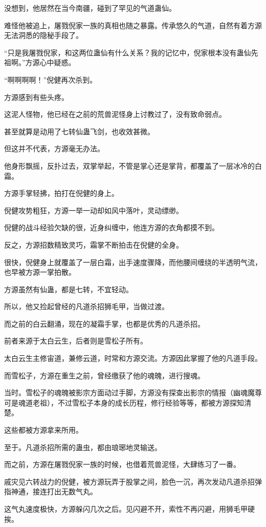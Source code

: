 \begin{this_body}
没想到，他居然在当今南疆，碰到了罕见的气道蛊仙。

难怪他被追上，屠戮倪家一族的真相也随之暴露。传承悠久的气道，自然有着方源无法洞悉的隐秘手段了。

“只是我屠戮倪家，和这两位蛊仙有什么关系？我的记忆中，倪家根本没有蛊仙先祖啊。”方源心中疑惑。

“啊啊啊啊！”倪健再次杀到。

方源感到有些头疼。

这泥人怪物，他已经在之前的荒兽泥怪身上讨教过了，没有致命弱点。

甚至就算是动用了七转仙蛊飞剑，也收效甚微。

但这并不代表，方源毫无办法。

他身形飘摇，反扑过去，双掌举起，不管是掌心还是掌背，都覆盖了一层冰冷的白霜。

方源手掌轻拂，拍打在倪健的身上。

倪健攻势粗狂，方源一举一动却如风中落叶，灵动缥缈。

倪健的战斗经验欠缺的很，近身纠缠中，他连方源的衣角都摸不到。

反之，方源招数精致灵巧，霜掌不断拍击在倪健的全身。

很快，倪健身上就覆盖了一层白霜，出手速度骤降，而他腰间缠绕的半透明气流，也早被方源一掌拍散。

方源虽然有仙蛊，都是七转，不宜轻动。

所以，他又捡起曾经的凡道杀招狮毛甲，当做过渡。

而之前的白云翻涌，现在的凝霜手掌，也都是优秀的凡道杀招。

前者来源于太白云生，后者则是雪松子所有。

太白云生主修宙道，兼修云道，时常和方源交流。方源因此掌握了他的凡道手段。

而雪松子，方源在重生之前，曾经缴获了他的魂魄，进行搜魂。

当时。雪松子的魂魄被影宗方面动过手脚，方源没有探查出影宗的情报（幽魂魔尊可是魂道老祖），不过雪松子本身的成长历程，修行经验等等，都被方源探知清楚。

这些都被方源拿来所用。

至于。凡道杀招所需的蛊虫，都由琅琊地灵输送。

而之前，方源在屠戮倪家一族的时候，也借着荒兽泥怪，大肆练习了一番。

戚灾见六转战力的倪健，被方源玩弄于股掌之间，脸色一沉，再次发动凡道杀招弹指神通，接连打出无数气丸。

这气丸速度极快，方源躲闪几次之后。见闪避不开，索性不再闪避，用狮毛甲硬挨。


\end{this_body}
